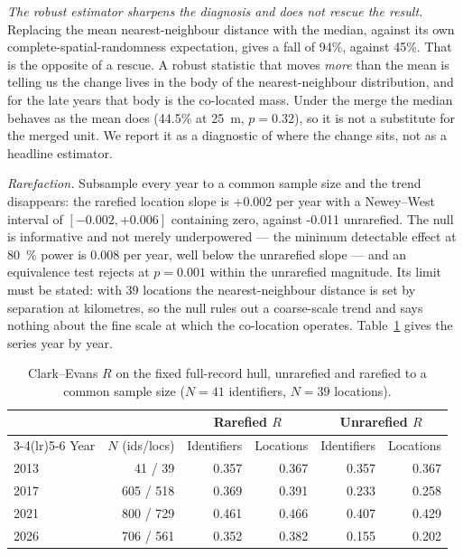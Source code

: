 \documentclass{article}
\newcommand{\rRareMDE}{0.008}
\newcommand{\rRareLocSlope}{+0.002}
\newcommand{\rRareLocLO}{-0.002}
\newcommand{\rRareLocHI}{+0.006}
\newcommand{\rRareLocN}{39}
\newcommand{\rHullLocSlope}{-0.011}
\newcommand{\tostR}{0.001}
\begin{document}
\noindent\emph{The robust estimator sharpens the diagnosis and does not rescue the result.}
Replacing the mean nearest-neighbour distance with the median, against its own
complete-spatial-randomness expectation, gives a fall of \num{94}\%, against \num{45}\%. That
is the opposite of a rescue. A robust statistic that moves \emph{more} than the mean is telling
us the change lives in the body of the nearest-neighbour distribution, and for the late years
that body is the co-located mass. Under the merge the median behaves as the mean does
(\num{44.5}\% at \SI{25}{\meter}, $p = 0.32$), so it is not a substitute for the merged unit. We
report it as a diagnostic of where the change sits, not as a headline estimator.

\noindent\emph{Rarefaction.} Subsample every year to a common sample size and the trend
disappears: the rarefied location slope is \rRareLocSlope{} per year with a Newey--West interval
of $[\rRareLocLO, \rRareLocHI]$ containing zero, against \rHullLocSlope{} unrarefied. The null
is informative and not merely underpowered --- the minimum detectable effect at
\SI{80}{\percent} power is \rRareMDE{} per year, well below the unrarefied slope --- and an
equivalence test rejects at $p = \tostR$ within the unrarefied magnitude. Its limit must be
stated: with \rRareLocN{} locations the nearest-neighbour distance is set by separation at
kilometres, so the null rules out a coarse-scale trend and says nothing about the fine scale at
which the co-location operates. Table~\ref{tab:rare-r} gives the series year by year.

\begin{table}[htbp]
\centering
\caption{Clark--Evans $R$ on the fixed full-record hull, unrarefied and rarefied to a common sample size ($N = 41$ identifiers, $N = 39$ locations).}
\label{tab:rare-r}
\footnotesize
\setlength{\tabcolsep}{5pt}
\begin{tabular}{lrrrrr}
\toprule
 & & \multicolumn{2}{c}{Rarefied $R$} & \multicolumn{2}{c}{Unrarefied $R$} \\
\cmidrule(lr){3-4}\cmidrule(lr){5-6}
Year & $N$ (ids/locs) & Identifiers & Locations & Identifiers & Locations \\
\midrule
2013 & 41 / 39 & 0.357 & 0.367 & 0.357 & 0.367 \\
2017 & 605 / 518 & 0.369 & 0.391 & 0.233 & 0.258 \\
2021 & 800 / 729 & 0.461 & 0.466 & 0.407 & 0.429 \\
2026 & 706 / 561 & 0.352 & 0.382 & 0.155 & 0.202 \\
\bottomrule
\end{tabular}
\end{table}
\end{document}
